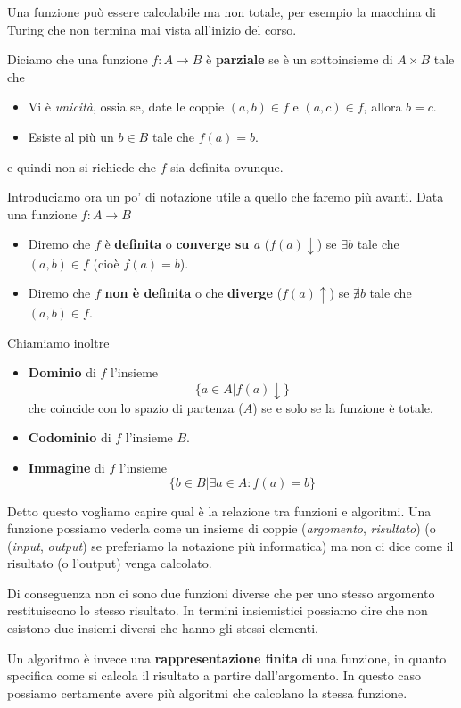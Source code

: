 Una funzione può essere calcolabile ma non totale, per esempio
la macchina di Turing che non termina mai vista all'inizio del
corso.

\begin{definition} \label{def: funzione parziale}
	Diciamo che una funzione $f : A \to B$ è \textbf{parziale}
	se è un sottoinsieme di $A \times B$ tale che
	\begin{itemize}
		\item Vi è \emph{unicità}, ossia se, date le coppie
		      $(a, b) \in f$ e $(a, c) \in f$, allora $b=c$.
		\item Esiste al più un $b \in B$ tale che $f(a) = b$.
	\end{itemize}
	e quindi non si richiede che $f$ sia definita ovunque.
\end{definition}

Introduciamo ora un po' di notazione utile a quello che faremo
più avanti. Data una funzione $f : A \to B$
\begin{itemize}
	\item Diremo che $f$ è \textbf{definita} o
	      \textbf{converge su $a$} ($f(a) \downarrow$) se
	      $\exists b$ tale che $(a, b) \in f$ (cioè
	      $f(a) = b$).
	\item Diremo che $f$ \textbf{non è definita} o che
	      \textbf{diverge} ($f(a) \uparrow$) se $\nexists b$
	      tale che $(a, b) \in f$.
\end{itemize}
Chiamiamo inoltre
\begin{itemize}
	\item \textbf{Dominio} di $f$ l'insieme
	      \[ \{ a \in A | f(a) \downarrow \} \]
	      che coincide con lo spazio di partenza ($A$) se e
	      solo se la funzione è totale.
	\item \textbf{Codominio} di $f$ l'insieme $B$.
	\item \textbf{Immagine} di $f$ l'insieme
	      \[ \{ b \in B | \exists a \in A : f(a) = b \} \]
\end{itemize}

Detto questo vogliamo capire qual è la relazione tra funzioni
e algoritmi. Una funzione possiamo vederla come un insieme di
coppie (\emph{argomento}, \emph{risultato}) (o (\emph{input},
\emph{output}) se preferiamo la notazione più informatica) ma
non ci dice come il risultato (o l'output) venga calcolato.

Di conseguenza non ci sono due funzioni diverse che per uno
stesso argomento restituiscono lo stesso risultato. In termini
insiemistici possiamo dire che non esistono due insiemi diversi
che hanno gli stessi elementi.
\begin{tcolorbox}
	Un algoritmo è invece una \textbf{rappresentazione finita}
	di una funzione, in quanto specifica come si calcola il
	risultato a partire dall'argomento. In questo caso possiamo
	certamente avere più algoritmi che calcolano la stessa
	funzione.
\end{tcolorbox}

